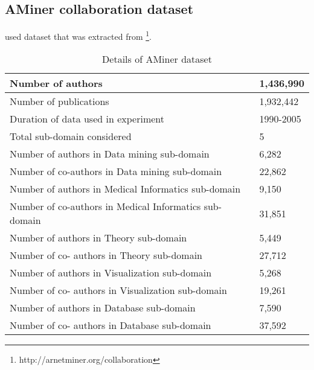 \subsection{AMiner collaboration dataset}
\cite{N65} used dataset that was extracted from \footnote{
http://arnetminer.org/collaboration}.
\\
\begin{table}[!htbp] 
\centering
\footnotesize
\def\arraystretch{1.4}%
\centering
\begin{tabular}{|p{8cm}|p{2cm}|}
\hline
Number of authors & 1,436,990
\\
\hline
Number of publications & 1,932,442
\\
\hline 
Duration of data used in experiment & 1990-2005
\\
\hline 
Total sub-domain considered & 5
\\
\hline
Number of authors in Data mining sub-domain & 6,282
\\
\hline
Number of co-authors in Data mining sub-domain & 22,862
\\
\hline
Number of authors in Medical Informatics sub-domain & 9,150
\\
\hline
Number of co-authors in Medical Informatics sub-domain & 31,851
\\
\hline
Number of authors in Theory sub-domain & 5,449
\\
\hline
Number of co- authors in Theory sub-domain & 27,712
\\
\hline
Number of authors in Visualization sub-domain & 5,268
\\
\hline
Number of co- authors in Visualization sub-domain & 19,261
\\
\hline
Number of authors in Database sub-domain & 7,590
\\
\hline
Number of co- authors in Database sub-domain & 37,592
\\
\hline
\end{tabular}

\caption{Details of AMiner dataset}
\label{table:1}
\end{table}
